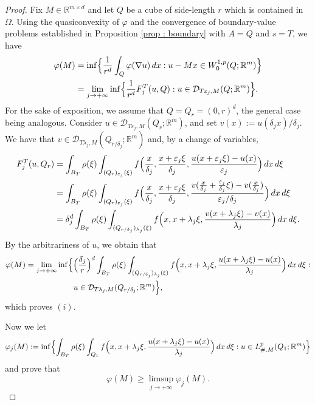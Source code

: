 \documentclass{article}
\theoremstyle{definition}
\newcommand{\f}{\varphi}
\newcommand{\ej}{\varepsilon_j}
\newcommand{\dej}{\delta_j}
\newcommand{\R}{\mathbb{R}}
\begin{document}
\begin{proof}
Fix $M\in \R^{m\times d}$ and let $Q$ be a cube of side-length $r$ which is contained in $\Omega$. Using the quasiconvexity of $\f$ and the convergence of boundary-value problems established in Proposition \ref{prop : boundary} with $A=Q$ and $s=T$, we have
    \begin{align*}
      \f(M) & = \inf \Bigl\{ \frac{1}{r^d}\int_{Q} \f(\nabla u) \, dx: u-Mx\in W^{1,p}_0(Q; \R^m) \Bigr\} \\ 
      & = \lim_{j\to+\infty} \inf\Bigl\{ \frac{1}{r^d}F^T_j(u, Q) : u\in \mathcal{D}_{T\ej,M}(Q; \R^m) \Bigr\}.
    \end{align*}
For the sake of exposition, we assume that $Q=Q_r=(0,r)^d$, the general case being analogous. Consider $u\in \mathcal{D}_{T\ej,M}(Q_r;\R^m)$, and set $v(x):=u(\dej x)/\dej$. We have that $v\in \mathcal{D}_{T\lambda_j,M}(Q_{r/\dej}; \R^m)$ and, by a change of variables, 
\begin{align*}
    F_j^T(u, Q_r) & = \int_{B_T} \rho(\xi)\int_{(Q_r)_{\ej}(\xi)} f\Bigl(\frac{x}{\dej},\frac{x+\ej\xi}{\dej},\frac{u(x+\ej\xi)-u(x)}{\ej}\Bigr)\, dx\,d\xi \\
    & = \int_{B_T} \rho(\xi)\int_{(Q_r)_{\ej}(\xi)} f\Bigl(\frac{x}{\dej},\frac{x+\ej\xi}{\dej},\frac{v(\tfrac{x}{\dej}+\tfrac{\ej}{\dej}\xi)-v(\tfrac{x}{\dej})}{\ej/\dej}\Bigr)\, dx\,d\xi \\
    & = \dej^d\int_{B_T} \rho(\xi)\int_{(Q_{r/\dej})_{\lambda_j}(\xi)} f\Bigl(x, x+\lambda_j\xi, \frac{v(x+\lambda_j\xi)-v(x)}{\lambda_j}\Bigr)\, dx\,d\xi.
\end{align*}
By the arbitrariness of $u$, we obtain that 
\begin{align*}
    \f(M) & = \lim_{j\to+\infty} \inf\Bigl\{ \Bigl(\frac{\dej}{r}\Bigr)^d\int_{B_T} \rho(\xi)\int_{(Q_{r/\dej})_{\lambda_j}(\xi)} f\Bigl(x, x+\lambda_j\xi, \frac{u(x+\lambda_j\xi)-u(x)}{\lambda_j}\Bigr)\, dx\,d\xi : \\
    & \qquad \qquad \qquad u\in \mathcal{D}_{T\lambda_j,M}(Q_{r/\dej}; \R^m) \Bigr\},
\end{align*}
which proves $(i)$.

\smallskip

Now we let
\begin{equation*}
    \f_j(M):=\inf\Bigl\{ \int_{B_T} \rho(\xi)\int_{Q_1} f\Bigl(x,x+\lambda_j\xi,\frac{u(x+\lambda_j\xi)-u(x)}{\lambda_j}\Bigr)\, dx\,d\xi : u\in L^p_{\#,M}(Q_1; \R^m) \Bigr\}
\end{equation*}
and prove that
\begin{equation}\label{cell lemma}
    \f(M)\geq \limsup_{j\to+\infty} \f_j(M).
\end{equation}


\end{proof}
\end{document}
